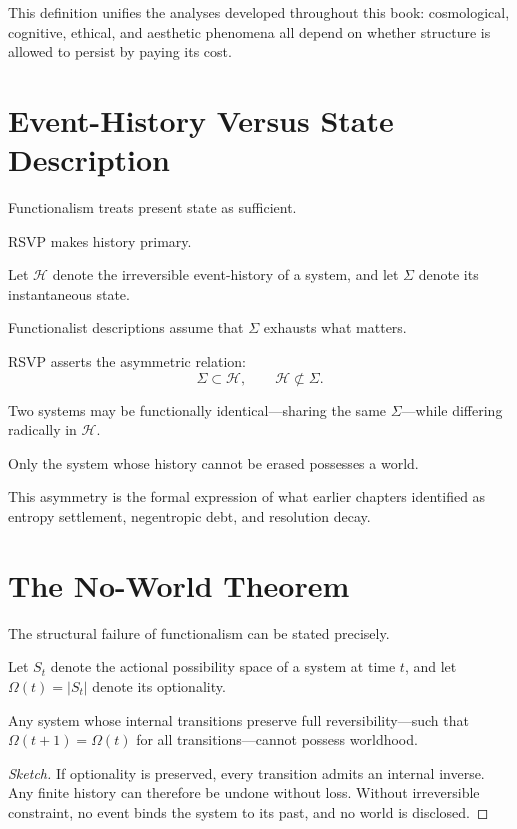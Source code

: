 \documentclass[11pt]{book}
\begin{document}
This definition unifies the analyses developed throughout this book: cosmological,
cognitive, ethical, and aesthetic phenomena all depend on whether structure is
allowed to persist by paying its cost.

\section{Event-History Versus State Description}

Functionalism treats present state as sufficient.

RSVP makes history primary.

Let $\mathcal{H}$ denote the irreversible event-history of a system, and let
$\Sigma$ denote its instantaneous state.

Functionalist descriptions assume that $\Sigma$ exhausts what matters.

RSVP asserts the asymmetric relation:
\[
\Sigma \subset \mathcal{H}, \qquad \mathcal{H} \not\subset \Sigma.
\]

Two systems may be functionally identical—sharing the same $\Sigma$—while differing
radically in $\mathcal{H}$.

Only the system whose history cannot be erased possesses a world.

This asymmetry is the formal expression of what earlier chapters identified as
entropy settlement, negentropic debt, and resolution decay.

\section{The No-World Theorem}

The structural failure of functionalism can be stated precisely.

Let $S_t$ denote the actional possibility space of a system at time $t$, and let
$\Omega(t) = |S_t|$ denote its optionality.

\begin{theorem}
Any system whose internal transitions preserve full reversibility—such that
$\Omega(t+1) = \Omega(t)$ for all transitions—cannot possess worldhood.
\end{theorem}

\begin{proof}[Sketch]
If optionality is preserved, every transition admits an internal inverse. Any
finite history can therefore be undone without loss. Without irreversible
constraint, no event binds the system to its past, and no world is disclosed.
\end{proof}
\end{document}
